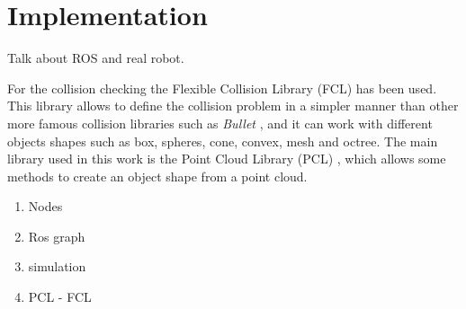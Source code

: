 \chapter{Implementation}
\label{ch:implementation}
Talk about ROS and real robot. 

For the collision checking the Flexible Collision Library (FCL) \citep{pan2012fcl} has been used. This library allows to define the collision problem in a simpler manner than other more famous collision libraries such as \textit{Bullet} \citep{Bullet}, and it can work with different objects shapes such as box, spheres, cone, convex, mesh and octree. 
The main library used in this work is the Point Cloud Library (PCL) \citep{PCL_}, which allows some methods to create an object shape from a point cloud.

\begin{enumerate}
\item Nodes
\item Ros graph 
\item simulation
\item PCL - FCL 
\end{enumerate}